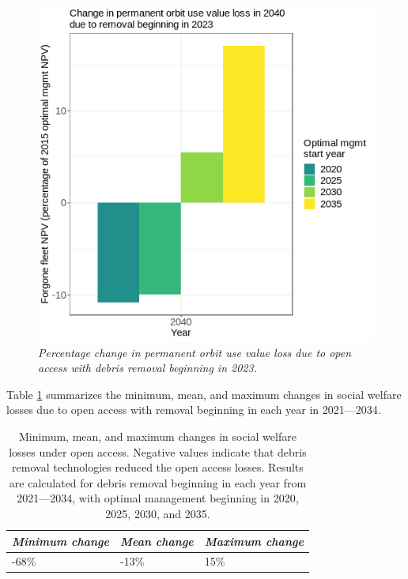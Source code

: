 \documentclass[12pt]{article}
\begin{document}
\begin{figure}[H]
	\centering
	\includegraphics[width=\textwidth]{../../images/remcomp_7_starts_percent_change_in_welf_loss_2006_remfrac_05_remstart_2023.png}
	\captionsetup{format=hang}
	\caption[Change in open access welfare loss due to debris removal in 2023]{\textit{Percentage change in permanent orbit use value loss due to open access with debris removal beginning in 2023.}
	}
	\label{coi_removal}
\end{figure}

Table \ref{coi_removal_sum} summarizes the minimum, mean, and maximum changes in social welfare losses due to open access with removal beginning in each year in 2021---2034.

\begin{table}[H]
	\centering
	\begin{tabular}{|l|l|l|}
		\hline
		\textit{Minimum change} & \textit{Mean change} & \textit{Maximum change} \\ \hline
		        -68\%              &  -13\%                  &   15\%                     \\ \hline
	\end{tabular}
	\caption[Minimum, mean, and maximum changes from debris removal on open access losses]{Minimum, mean, and maximum changes in social welfare losses under open access. Negative values indicate that debris removal technologies reduced the open access losses. Results are calculated for debris removal beginning in each year from 2021---2034, with optimal management beginning in 2020, 2025, 2030, and 2035.}
	\label{coi_removal_sum}
\end{table}
\end{document}
